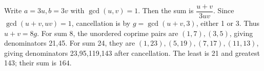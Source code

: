 Write $a=3u,b=3v$ with $\gcd(u,v)=1$. Then the sum is $\dfrac{u+v}{3uv}$. Since $\gcd(u+v,uv)=1$, cancellation is by $g=\gcd(u+v,3)$, either 1 or 3. Thus $u+v=8g$. For sum 8, the unordered coprime pairs are $(1,7),(3,5)$, giving denominators 21,45. For sum 24, they are $(1,23),(5,19),(7,17),(11,13)$, giving denominators 23,95,119,143 after cancellation. The least is 21 and greatest 143; their sum is $\boxed{164}$.
